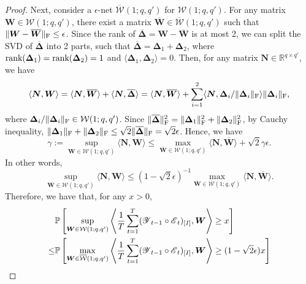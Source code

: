 \documentclass[12pt]{article}
\newcommand{\bm}{\boldsymbol}
\newcommand{\cm}[1]{\mbox{\boldmath$\mathscr{#1}$}}
\begin{document}
\begin{proof}
	Next, consider a $\epsilon$-net $\overline{\mathcal{W}}(1;q,q')$ for $\mathcal{W}(1;q,q')$. For any matrix $\bm{W}\in\mathcal{W}(1;q,q')$, there exist a matrix $\overline{\bm{W}}\in\overline{\mathcal{W}}(1;q,q')$ such that $\|\bm{W}-\overline{\bm{W}}\|_\textup{F}\leq\epsilon$. Since the rank of $\overline{\bm{\Delta}}=\bm{W}-\overline{\bm{W}}$ is at most 2, we can split the SVD of $\overline{\bm{\Delta}}$ into 2 parts, such that $\overline{\bm{\Delta}}=\bm{\Delta}_1+\bm{\Delta}_2$, where $\textup{rank}(\bm{\Delta}_1)=\textup{rank}(\bm{\Delta}_2)=1$ and $\langle\bm{\Delta}_1,\bm{\Delta}_2\rangle=0$. Then, for any matrix $\bm{N}\in\mathbb{R}^{q\times q'}$, we have
	\begin{equation}
	\langle\bm{N},\bm{W}\rangle=\langle\bm{N},\overline{\bm{W}}\rangle+\langle\bm{N},\overline{\bm{\Delta}}\rangle=\langle\bm{N},\overline{\bm{W}}\rangle+\sum_{i=1}^2\langle\bm{N},\bm{\Delta}_i	/\|\bm{\Delta}_i\|_\textup{F}\rangle\|\bm{\Delta}_i\|_\textup{F},
	\end{equation}
	where $\bm{\Delta}_i/\|\bm{\Delta}_i\|_{\textup{F}}\in\mathcal{W}(1;q,q')$. Since $\|\overline{\bm{\Delta}}\|_\textup{F}^2=\|\bm{\Delta}_1\|_\textup{F}^2+\|\bm{\Delta}_2\|_\textup{F}^2$, by Cauchy inequality, $\|\bm{\Delta}_1\|_\textup{F}+\|\bm{\Delta}_2\|_\textup{F}\leq\sqrt{2}\|\overline{\bm{\Delta}}\|_\text{F}=\sqrt{2}\epsilon$. Hence, we have
	\begin{equation}
	\gamma:=\sup_{\bm{W}\in\mathcal{W}(1;q,q')}\langle\bm{N},\bm{W}\rangle\leq\max_{\overline{\bm{W}}\in\overline{\mathcal{W}}(1;q,q')}\langle\bm{N},\overline{\bm{W}}\rangle+\sqrt{2}\gamma\epsilon.
	\end{equation}
	In other words,
	\begin{equation}
	\sup_{\bm{W}\in\mathcal{W}(1;q,q')}\langle\bm{N},\bm{W}\rangle\leq(1-\sqrt{2}\epsilon)^{-1}\max_{\overline{\bm{W}}\in\overline{\mathcal{W}}(1;q,q')}\langle\bm{N},\overline{\bm{W}}\rangle.
	\end{equation}
	Therefore, we have that, for any $x>0$,
	\begin{equation}
	\label{eq:sup_covering}
	\begin{split}
	&\mathbb{P}\left[\sup_{\bm{W}\in\mathcal{W}(1;q,q')}\left\langle\frac{1}{T}\sum_{t=1}^T(\cm{Y}_{t-1}\circ\cm{E}_t)_{[I]},\bm{W}\right\rangle\geq x\right]\\
	\leq&\mathbb{P}\left[\max_{\bm{W}\in\overline{\mathcal{W}}(1;q,q')}\left\langle\frac{1}{T}\sum_{t=1}^T(\cm{Y}_{t-1}\circ\cm{E}_t)_{[I]},\bm{W}\right\rangle\geq (1-\sqrt{2}\epsilon)x\right]\\

\end{split}
\end{equation}
\end{proof}
\end{document}
